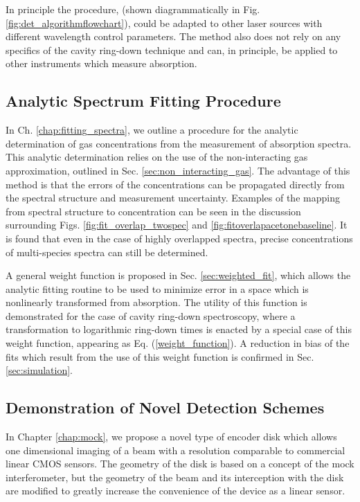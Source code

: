 \documentclass[8pt,a4paper]{report}
\begin{document}
	In principle the procedure, (shown diagrammatically in Fig. \ref{fig:det_algorithmflowchart}), could be adapted to other laser sources with different wavelength control parameters. The method also does not rely on any specifics of the cavity ring-down technique and can, in principle, be applied to other instruments which measure absorption.
	
	\subsection{Analytic Spectrum Fitting Procedure}
	In Ch. \ref{chap:fitting_spectra}, we outline a procedure for the analytic determination of gas concentrations from the measurement of absorption spectra. This analytic determination relies on the use of the non-interacting gas approximation, outlined in Sec. \ref{sec:non_interacting_gas}. The advantage of this method is that the errors of the concentrations can be propagated directly from the spectral structure and measurement uncertainty. Examples of the mapping from spectral structure to concentration can be seen in the discussion surrounding Figs. \ref{fig:fit_overlap_twospec} and \ref{fig:fitoverlapacetonebaseline}. It is found that even in the case of highly overlapped spectra, precise concentrations of multi-species spectra can still be determined.
	
	A general weight function is proposed in Sec. \ref{sec:weighted_fit}, which allows the analytic fitting routine to be used to minimize error in a space which is nonlinearly transformed from absorption. The utility of this function is demonstrated for the case of cavity ring-down spectroscopy, where a transformation to logarithmic ring-down times is enacted by a special case of this weight function, appearing as Eq. (\ref{weight_function}). A reduction in bias of the fits which result from the use of this weight function is confirmed in Sec. \ref{sec:simulation}.
	
	\subsection{Demonstration of Novel Detection Schemes}
	In Chapter \ref{chap:mock}, we propose a novel type of encoder disk which allows one dimensional imaging of a beam with a resolution comparable to commercial linear CMOS sensors. The geometry of the disk is based on a concept of the mock interferometer, but the geometry of the beam and its interception with the disk are modified to greatly increase the convenience of the device as a linear sensor.
	
\end{document}

